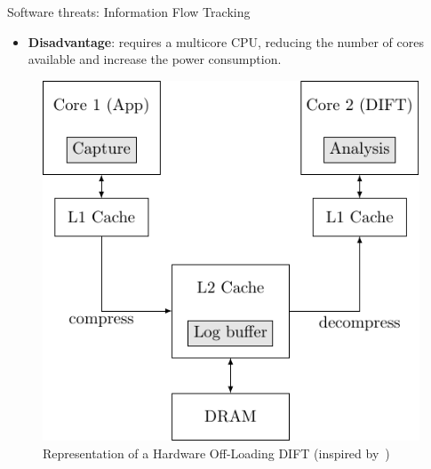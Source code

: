 \begin{frame}{Software threats: Information Flow Tracking}
\begin{minipage}[c]{0.45\textwidth}
        \begin{alertblock}{}
            \begin{itemize}
                [square]
                \justifying
                \item \textbf{Disadvantage}: requires a multicore CPU, reducing the number of cores available and increase the power consumption.
            \end{itemize}
        \end{alertblock}
    \end{minipage}\hfill%
    \begin{minipage}[c]{0.5\textwidth}
        \begin{figure}
            \centering
            \includegraphics[height=.75\textheight]{src/1_introduction/img/offloading.pdf}
            \caption{Representation of a Hardware Off-Loading DIFT (inspired by~\cite{KDK-09-dsn})}
            \label{fig:offloading}
        \end{figure}
    \end{minipage}
\end{frame}

